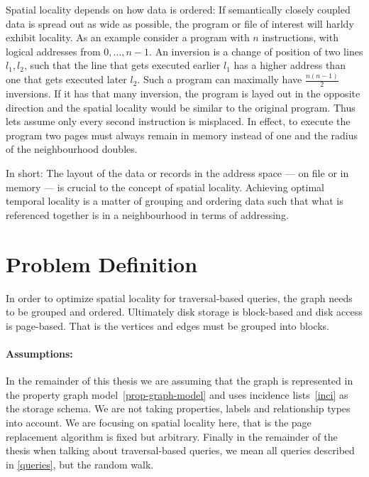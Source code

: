     Spatial locality depends on how data is ordered:
    If semantically closely coupled data is spread out as wide as possible, the program or file of interest will harldy exhibit locality. 
    As an example consider a program with $n$ instructions, with logical addresses from $0, \dots, n-1$. 
    An inversion is a change of position of two lines $l_1, l_2$, such that the line that gets executed earlier $l_1$ has a higher address than one that gets executed later $l_2$.
    Such a program can maximally have $\frac{n (n-1)}{2}$ inversions. 
    If it has that many inversion, the program is layed out in the opposite direction and the spatial locality would be similar to the original program.
    Thus lets assume only every second instruction is misplaced. 
    In effect, to execute the program two pages must always remain in memory instead of one and the radius of the neighbourhood doubles.
    
    In short: 
    The layout of the data or records in the address space --- on file or in memory --- is crucial to the concept of spatial locality. 
    Achieving optimal temporal locality is a matter of grouping and ordering data such that what is referenced together is in a neighbourhood in terms of addressing.
    
          
\section{Problem Definition}\label{\positionnumber}
    In order to optimize spatial locality for traversal-based queries, the graph needs to be grouped and ordered.
    Ultimately disk storage is block-based and disk access is page-based. 
    That is the vertices and edges must be grouped into blocks.
    
    \paragraph{Assumptions:}
    In the remainder of this thesis we are assuming that the graph is represented in the property graph model~\ref{prop-graph-model} and uses incidence lists~\ref{inci} as the storage schema. 
    We are not taking properties, labels and relationship types into account.
    We are focusing on spatial locality here, that is the page replacement algorithm is fixed but arbitrary.
    Finally in the remainder of the thesis when talking about traversal-based queries, we mean all queries described in \ref{queries}, but the random walk.
    
